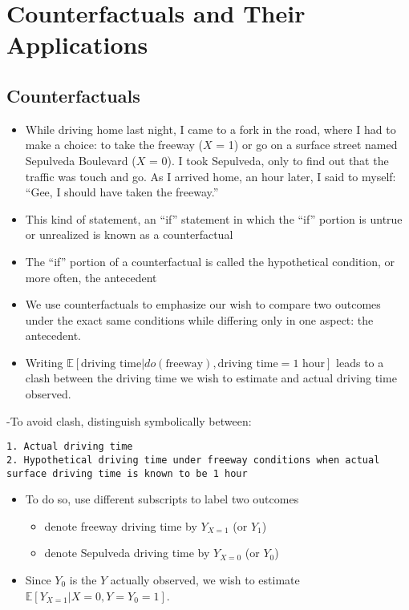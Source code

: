 \documentclass[]{article}
\providecommand{\tightlist}{%
  \setlength{\itemsep}{0pt}\setlength{\parskip}{0pt}}
\begin{document}
\section{Counterfactuals and Their
Applications}\label{counterfactuals-and-their-applications}

\subsection{Counterfactuals}\label{counterfactuals}

\begin{itemize}
\item
  While driving home last night, I came to a fork in the road, where I
  had to make a choice: to take the freeway (\(X\) = 1) or go on a
  surface street named Sepulveda Boulevard (\(X\) = 0). I took
  Sepulveda, only to find out that the traffic was touch and go. As I
  arrived home, an hour later, I said to myself: ``Gee, I should have
  taken the freeway.''
\item
  This kind of statement, an ``if'' statement in which the ``if''
  portion is untrue or unrealized is known as a counterfactual
\item
  The ``if'' portion of a counterfactual is called the hypothetical
  condition, or more often, the antecedent
\item
  We use counterfactuals to emphasize our wish to compare two outcomes
  under the exact same conditions while differing only in one aspect:
  the antecedent.
\item
  Writing
  \(\mathbb{E}[\text{driving time}|do(\text{freeway}), \text{driving time}=1 \text{ hour}]\)
  leads to a clash between the driving time we wish to estimate and
  actual driving time observed.
\end{itemize}

-To avoid clash, distinguish symbolically between:

\begin{verbatim}
1. Actual driving time
2. Hypothetical driving time under freeway conditions when actual surface driving time is known to be 1 hour
\end{verbatim}

\begin{itemize}
\item
  To do so, use different subscripts to label two outcomes

  \begin{itemize}
  \tightlist
  \item
    denote freeway driving time by \(Y_{X = 1}\) (or \(Y_1\))
  \item
    denote Sepulveda driving time by \(Y_{X = 0}\) (or \(Y_0\))
  \end{itemize}
\item
  Since \(Y_0\) is the \(Y\) actually observed, we wish to estimate
  \(\mathbb{E}[Y_{X=1}| X = 0, Y = Y_0 = 1]\).
\end{itemize}
\end{document}
